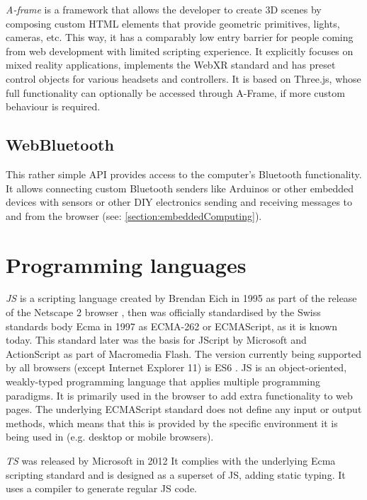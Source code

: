 \emph{A-frame} is a framework that allows the developer to create \ac{3D} scenes by composing custom HTML elements that provide geometric primitives, lights, cameras, etc. This way, it has a comparably low entry barrier for people coming from web development with limited scripting experience. It explicitly focuses on mixed reality applications, implements the WebXR standard and has preset control objects for various headsets and controllers. It is based on Three.js, whose full functionality can optionally be accessed through A-Frame, if more custom behaviour is required.

\subsection{WebBluetooth}

This rather simple \ac{API} provides access to the computer's Bluetooth functionality. It allows connecting custom Bluetooth senders like Arduinos or other embedded devices with sensors or other \ac{DIY} electronics sending and receiving messages to and from the browser (see: \autoref{section:embeddedComputing}).

\section{Programming languages}
\label{section:programmingLanguages}



\emph{\ac{JS}} is a scripting language created by Brendan Eich in 1995 as part of the release of the Netscape 2 browser \parencite{javascriptRelease}, then was officially standardised by the Swiss standards body Ecma in 1997 as ECMA-262 or ECMAScript, as it is known today. This standard later was the basis for JScript by Microsoft and ActionScript as part of Macromedia Flash. The version currently being supported by all browsers (except Internet Explorer 11) is \ac{ES6} \parencite{javascriptHistory}. \ac{JS} is an object-oriented, weakly-typed programming language that applies multiple programming paradigms. It is primarily used in the browser to add extra functionality to web pages. The underlying ECMAScript standard does not define any input or output methods, which means that this is provided by the specific environment it is being used in (e.g. desktop or mobile browsers).

\emph{\ac{TS}} was released by Microsoft in 2012  It complies with the underlying Ecma scripting standard and is designed as a superset of \ac{JS}, adding static typing. It uses a compiler to generate regular \ac{JS} code.

